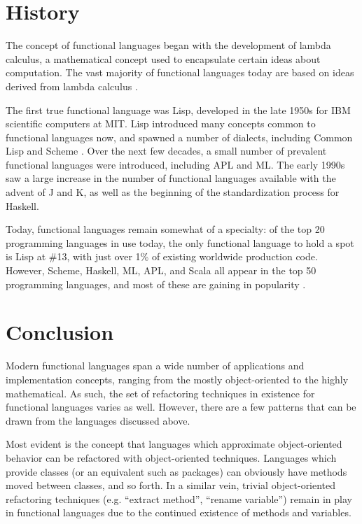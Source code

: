 \documentclass{article}
\begin{document}
\section{History}

The concept of functional languages began with the development of lambda calculus, a mathematical concept used to encapsulate certain ideas about computation. The vast majority of functional languages today are based on ideas derived from lambda calculus \cite{combinatorylogic}.

The first true functional language was Lisp, developed in the late 1950s for IBM scientific computers at MIT. Lisp introduced many concepts common to functional languages now, and spawned a number of dialects, including Common Lisp and Scheme \cite{historyoflisp}. Over the next few decades, a small number of prevalent functional languages were introduced, including APL and ML. The early 1990s saw a large increase in the number of functional languages available with the advent of J and K, as well as the beginning of the standardization process for Haskell.

Today, functional languages remain somewhat of a specialty: of the top 20 programming languages in use today, the only functional language to hold a spot is Lisp at \#13, with just over 1\% of existing worldwide production code. However, Scheme, Haskell, ML, APL, and Scala all appear in the top 50 programming languages, and most of these are gaining in popularity \cite{TIOBE}.











\section{Conclusion}

Modern functional languages span a wide number of applications and implementation concepts, ranging from the mostly object-oriented to the highly mathematical. As such, the set of refactoring techniques in existence for functional languages varies as well. However, there are a few patterns that can be drawn from the languages discussed above.

Most evident is the concept that languages which approximate object-oriented behavior can be refactored with object-oriented techniques. Languages which provide classes (or an equivalent such as packages) can obviously have methods moved between classes, and so forth. In a similar vein, trivial object-oriented refactoring techniques (e.g. ``extract method'', ``rename variable'') remain in play in functional languages due to the continued existence of methods and variables.
\end{document}
